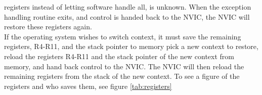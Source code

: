registers instead of letting software handle all, is unknown. 
When the exception handling routine exits, and control is handed back to the NVIC,
the NVIC will restore these registers again.\\
If the operating system wishes to switch context, it must save the remaining registers, R4-R11, and the stack pointer to memory
pick a new context to restore, reload the registers R4-R11 and the stack pointer of the new context from memory,
and hand back control to the NVIC. The NVIC will then reload the remaining registers from the stack of the new context. To see a figure of the registers and who saves them, see figure \ref{tab:registers}\\\\


